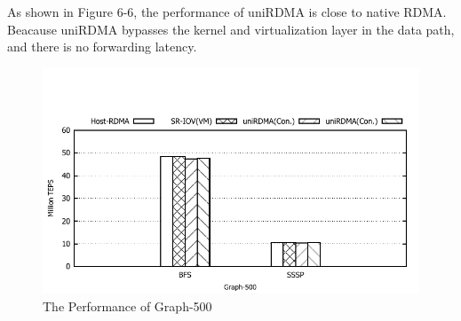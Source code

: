 As shown in Figure 6-6,  the performance of uniRDMA is close to native RDMA. Beacause uniRDMA bypasses the kernel and virtualization layer in the data path, and there is no  forwarding latency.

\begin{figure}[!ht]
	\centering
	\includegraphics[width=1.0\linewidth]{images/graph-500}
	\caption{The Performance of Graph-500}
	\label{fig:graph-500}
\end{figure}
